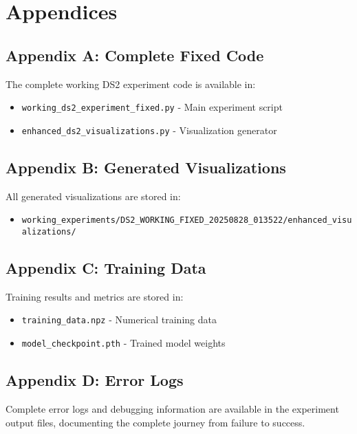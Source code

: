 \documentclass[11pt,a4paper]{article}
\begin{document}
\section{Appendices}

\subsection{Appendix A: Complete Fixed Code}

The complete working DS2 experiment code is available in:
\begin{itemize}
    \item \texttt{working\_ds2\_experiment\_fixed.py} - Main experiment script
    \item \texttt{enhanced\_ds2\_visualizations.py} - Visualization generator
\end{itemize}

\subsection{Appendix B: Generated Visualizations}

All generated visualizations are stored in:
\begin{itemize}
    \item \texttt{working\_experiments/DS2\_WORKING\_FIXED\_20250828\_013522/enhanced\_visualizations/}
\end{itemize}

\subsection{Appendix C: Training Data}

Training results and metrics are stored in:
\begin{itemize}
    \item \texttt{training\_data.npz} - Numerical training data
    \item \texttt{model\_checkpoint.pth} - Trained model weights
\end{itemize}

\subsection{Appendix D: Error Logs}

Complete error logs and debugging information are available in the experiment output files, documenting the complete journey from failure to success.
\end{document}
